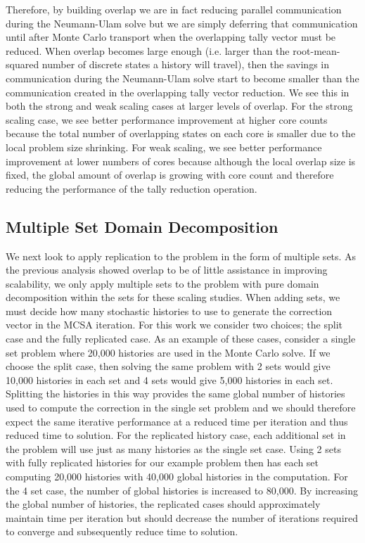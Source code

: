 \documentclass{snamc2013}
\begin{document}
Therefore, by building overlap we are in fact reducing parallel
communication during the Neumann-Ulam solve but we are simply
deferring that communication until after Monte Carlo transport when
the overlapping tally vector must be reduced. When overlap becomes
large enough (i.e. larger than the root-mean-squared number of
discrete states a history will travel), then the savings in
communication during the Neumann-Ulam solve start to become smaller
than the communication created in the overlapping tally vector
reduction. We see this in both the strong and weak scaling cases at
larger levels of overlap. For the strong scaling case, we see better
performance improvement at higher core counts because the total number
of overlapping states on each core is smaller due to the local problem
size shrinking. For weak scaling, we see better performance
improvement at lower numbers of cores because although the local
overlap size is fixed, the global amount of overlap is growing with
core count and therefore reducing the performance of the tally
reduction operation.

\subsection{Multiple Set Domain Decomposition}
\label{subsec:ms_decomposition}
We next look to apply replication to the problem in the form of
multiple sets. As the previous analysis showed overlap to be of little
assistance in improving scalability, we only apply multiple sets to
the problem with pure domain decomposition within the sets for these
scaling studies. When adding sets, we must decide how many stochastic
histories to use to generate the correction vector in the MCSA
iteration. For this work we consider two choices; the split case and
the fully replicated case. As an example of these cases, consider a
single set problem where 20,000 histories are used in the Monte Carlo
solve. If we choose the split case, then solving the same problem with
2 sets would give 10,000 histories in each set and 4 sets would give
5,000 histories in each set. Splitting the histories in this way
provides the same global number of histories used to compute the
correction in the single set problem and we should therefore expect
the same iterative performance at a reduced time per iteration and
thus reduced time to solution. For the replicated history case, each
additional set in the problem will use just as many histories as the
single set case. Using 2 sets with fully replicated histories for our
example problem then has each set computing 20,000 histories with
40,000 global histories in the computation. For the 4 set case, the
number of global histories is increased to 80,000. By increasing the
global number of histories, the replicated cases should approximately
maintain time per iteration but should decrease the number of
iterations required to converge and subsequently reduce time to
solution.
\end{document}
